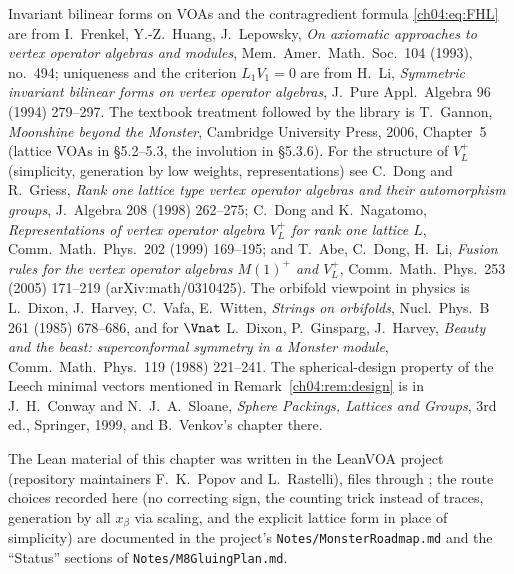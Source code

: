 Invariant bilinear forms on VOAs and the contragredient formula \eqref{ch04:eq:FHL} are from
I.~Frenkel, Y.-Z.~Huang, J.~Lepowsky, \emph{On axiomatic approaches to vertex operator algebras and
modules}, Mem.\ Amer.\ Math.\ Soc.\ 104 (1993), no.~494; uniqueness and the criterion $L_1V_1=0$ are
from H.~Li, \emph{Symmetric invariant bilinear forms on vertex operator algebras}, J.\ Pure Appl.\
Algebra 96 (1994) 279--297. The textbook treatment followed by the library is T.~Gannon,
\emph{Moonshine beyond the Monster}, Cambridge University Press, 2006, Chapter~5 (lattice VOAs in
\S5.2--5.3, the involution in \S5.3.6). For the structure of $V_L^+$ (simplicity, generation by low
weights, representations) see C.~Dong and R.~Griess, \emph{Rank one lattice type vertex operator
algebras and their automorphism groups}, J.\ Algebra 208 (1998) 262--275; C.~Dong and K.~Nagatomo,
\emph{Representations of vertex operator algebra $V_L^+$ for rank one lattice $L$}, Comm.\ Math.\
Phys.\ 202 (1999) 169--195; and T.~Abe, C.~Dong, H.~Li, \emph{Fusion rules for the vertex operator
algebras $M(1)^+$ and $V_L^+$}, Comm.\ Math.\ Phys.\ 253 (2005) 171--219 (arXiv:math/0310425). The
orbifold viewpoint in physics is L.~Dixon, J.~Harvey, C.~Vafa, E.~Witten, \emph{Strings on orbifolds},
Nucl.\ Phys.\ B 261 (1985) 678--686, and for $\Vnat$ L.~Dixon, P.~Ginsparg, J.~Harvey, \emph{Beauty
and the beast: superconformal symmetry in a Monster module}, Comm.\ Math.\ Phys.\ 119 (1988)
221--241. The spherical-design property of the Leech minimal vectors mentioned in
Remark~\ref{ch04:rem:design} is in J.~H.~Conway and N.~J.~A.~Sloane, \emph{Sphere Packings, Lattices
and Groups}, 3rd ed., Springer, 1999, and B.~Venkov's chapter there.

The Lean material of this chapter was written in the LeanVOA project (repository maintainers
F.~K.~Popov and L.~Rastelli), files  through
\leanpath{NondegLeech.lean}; the route choices recorded here (no correcting sign, the counting trick
instead of traces, generation by all $x_\beta$ via scaling, and the explicit lattice form in place of
simplicity) are documented in the project's
\texttt{Notes/MonsterRoadmap.md} and the ``Status'' sections of \texttt{Notes/M8GluingPlan.md}.
